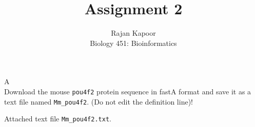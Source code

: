 \documentclass[12pt]{article}
\begin{document}
 
\title{Assignment 2}
\author{Rajan Kapoor\\ 
Biology 451: Bioinformatics}
 
\maketitle
 
\begin{problem}{A}
\text{ }\\
Download the mouse \texttt{pou4f2} protein sequence in fastA format and save it as a text file named \texttt{Mm\_pou4f2}. (Do not edit the definition line)! 
\end{problem}
 
\begin{solution}
Attached text file \texttt{Mm\_pou4f2.txt}.
\end{solution}
\end{document}
